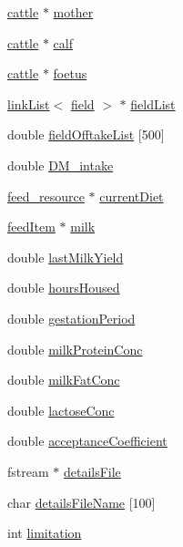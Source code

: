 \begin{DoxyCompactItemize}
\item 
\hyperlink{classcattle}{cattle} $\ast$ \hyperlink{classcattle_acf6345c41d725963b2bb91a744039050}{mother}
\item 
\hyperlink{classcattle}{cattle} $\ast$ \hyperlink{classcattle_a98e2eb85c986738249c5ee54efcbdeba}{calf}
\item 
\hyperlink{classcattle}{cattle} $\ast$ \hyperlink{classcattle_a6b3f173720e6c3c4fd533edce88b7301}{foetus}
\item 
\hyperlink{classlink_list}{linkList}$<$ \hyperlink{classfield}{field} $>$ $\ast$ \hyperlink{classcattle_aac3175b986188a50d979ab1cac4af3ea}{fieldList}
\item 
double \hyperlink{classcattle_aaf87eabecd0e08dcee9d848227c83cd3}{fieldOfftakeList} \mbox{[}500\mbox{]}
\item 
double \hyperlink{classcattle_a57f185cfef76fec68f325e0197edc51b}{DM\_\-intake}
\item 
\hyperlink{classfeed__resource}{feed\_\-resource} $\ast$ \hyperlink{classcattle_a1793c177cc739ddb54c8b0f21e1b83f9}{currentDiet}
\item 
\hyperlink{classfeed_item}{feedItem} $\ast$ \hyperlink{classcattle_a5242362db2f5a4411f19ec2163eabc4e}{milk}
\item 
double \hyperlink{classcattle_a363b662f01ef25b47283840fd205c9e9}{lastMilkYield}
\item 
double \hyperlink{classcattle_ae5c1f207860f644db590c44eb6ae082b}{hoursHoused}
\item 
double \hyperlink{classcattle_a59856200751c49a71847fa421bfada3c}{gestationPeriod}
\item 
double \hyperlink{classcattle_a1d6da32047ee60f0cbdacee9519f16e3}{milkProteinConc}
\item 
double \hyperlink{classcattle_aa5a4f55d7d0575a6e828c212c84bc909}{milkFatConc}
\item 
double \hyperlink{classcattle_a426bdf1c322f7dc4c5447fae45c259eb}{lactoseConc}
\item 
double \hyperlink{classcattle_a54c41c4168fa7a8bf51dbab9c79c9b61}{acceptanceCoefficient}
\item 
fstream $\ast$ \hyperlink{classcattle_a484fc80eeb5bf6fdcc1e4f0a43a647b0}{detailsFile}
\item 
char \hyperlink{classcattle_a70bffbbd0dba38315fa124c06b4c8814}{detailsFileName} \mbox{[}100\mbox{]}
\item 
int \hyperlink{classcattle_a00961d35073fae6a1a1e81dfaad97d12}{limitation}
\item 

\end{DoxyCompactItemize}
